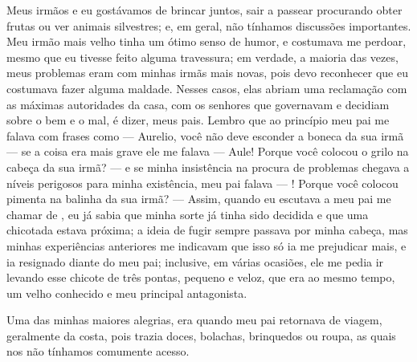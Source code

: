 Meus irmãos e eu gostávamos de brincar juntos, sair a passear procurando obter frutas ou ver animais silvestres; e, em geral, não tínhamos discussões importantes. Meu irmão mais velho tinha um ótimo senso de humor, e costumava me perdoar, mesmo que eu tivesse feito alguma travessura; em verdade, a maioria das vezes, meus problemas eram com minhas irmãs mais novas, pois devo reconhecer que eu costumava fazer alguma maldade.
Nesses casos, elas abriam uma reclamação com as máximas autoridades da casa, com os senhores que governavam e decidiam sobre o bem e o mal, é dizer, meus pais. Lembro que ao princípio meu pai me falava com frases como --- Aurelio, você não deve esconder a boneca da sua irmã --- se a coisa era mais grave ele me falava --- Aule! Porque você colocou o grilo na cabeça da sua irmã? --- e se minha insistência na procura de problemas chegava a níveis perigosos para minha existência, meu pai falava --- \Aulicha! Porque você colocou pimenta na balinha da sua irmã? ---
Assim, quando eu escutava a meu pai me chamar de \Aulicha, eu já sabia que minha sorte já tinha sido decidida e que uma chicotada estava próxima; a ideia de fugir sempre passava por minha cabeça, mas minhas experiências anteriores me indicavam que isso só ia me prejudicar mais, e ia resignado diante do meu pai; inclusive, em várias ocasiões, ele me pedia ir levando esse chicote de três pontas, pequeno e veloz, que era ao mesmo tempo, um velho conhecido e meu principal antagonista.

Uma das minhas maiores alegrias, era quando meu pai retornava de viagem, geralmente da costa, pois trazia doces, bolachas, brinquedos ou roupa, as quais nos não tínhamos comumente acesso.




